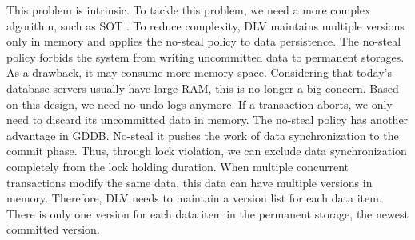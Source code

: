 \documentclass[conference]{IEEEtran}
\begin{document}
This problem is intrinsic.
To tackle this problem, we need a more complex algorithm, such as SOT \cite{UnifyCR:journals/is/AlonsoVABASW94}.
To reduce complexity, DLV maintains multiple versions only in memory and applies the no-steal policy to data persistence.
The no-steal policy forbids the system from writing uncommitted data to permanent storages.
As a drawback, it may consume more memory space.
Considering that today's database servers usually have large RAM, this is no longer a big concern.
Based on this design, we need no undo logs anymore. If a transaction aborts, we only need to discard its uncommitted data in memory.
The no-steal policy has another advantage in GDDB.
No-steal it pushes the work of data synchronization to the commit phase.
Thus, through lock violation, we can exclude data synchronization completely from the lock holding duration. 
When multiple concurrent transactions modify the same data, this data can have multiple versions in memory.
Therefore, DLV needs to maintain a version list for each data item.
There is only one version for each data item in the permanent storage, the newest committed version.
\end{document}
